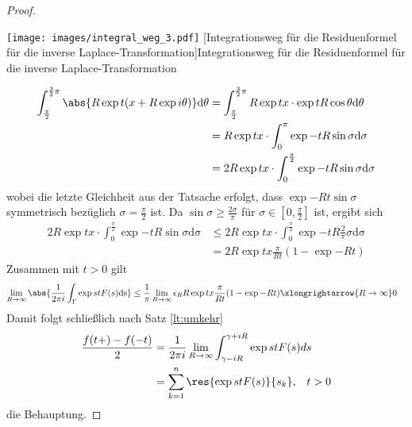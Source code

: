 \begin{satz}
\begin{proof}
\begin{minipage}{0.36\textwidth}
\begin{flushright}
		\texttt{[image: images/integral\_weg\_3.pdf]}
		[Integrationsweg für die Residuenformel für die inverse Laplace-Transformation]{Integrationsweg für die Residuenformel für die inverse Laplace-Transformation}
\end{flushright}
\end{minipage}
\begin{align}
	\int_{\frac{\pi}{2}}^{\frac{3}{2}\pi} \abs{R \exp{t (x+R  \exp{i \theta })} } \mathrm{d\theta} 
	&= \int_{\frac{\pi}{2}}^{\frac{3}{2}\pi} R \exp{tx} \cdot \exp{t R \cos{\theta}} \mathrm{d\theta} \\
	&= R \exp{tx} \cdot \int_{0}^{{\pi}} \exp{-t R \sin{\sigma}}	\mathrm{d\sigma}\\
	&= 2 R \exp{tx} \cdot \int_{0}^{\frac{\pi}{2}} \exp{-t R \sin{\sigma}}	\mathrm{d\sigma}\\
\end{align} 
wobei die letzte Gleichheit aus der Tatsache erfolgt, dass $\exp{-R t \sin{\sigma}}$ symmetrisch bezüglich $\sigma = \frac{\pi}{2}$ ist. Da $\sin{\sigma} \geq \frac{2 \sigma}{\pi}$ für $\sigma \in [0, \frac{\pi}{2}]$ ist, ergibt sich
\begin{align}
	2 R \exp{tx} \cdot \int_{0}^{\frac{\pi}{2}} \exp{-t R \sin{\sigma}}\mathrm{d\sigma} &\leq 2 R \exp{tx} \cdot \int_{0}^{\frac{\pi}{2}} \exp{-t R \frac{2}{\pi} \sigma}\mathrm{d\sigma}\\
	&= 2 R \exp{tx} \frac{\pi}{R t} (1 - \exp{-Rt})
\end{align}
Zusammen mit $t> 0$ gilt
\begin{align}
	 \lim_{R \rightarrow \infty}{\abs{\frac{1}{2\pi i} \int_{\Gamma} \exp{st}F(s)\mathrm{ds}}} 
	 &\leq 	\frac{1}{\pi} \lim_{R \rightarrow \infty} \epsilon_R R \exp{tx} \frac{\pi}{R t} (1 - \exp{-Rt})
	 \xlongrightarrow{R \rightarrow \infty} 0
\end{align}
Damit folgt schließlich nach Satz \ref{lt:umkehr} 
\begin{align}
\frac{f(t+) - f(-t)}{2} &= \frac{1}{2 \pi i } \lim_{R \rightarrow \infty} \int_{\gamma - i R}^{\gamma+ i R} \exp{st} F(s) ds \\
	&= \sum_{k=1}^{n} \res{\exp{st} F(s)}{s_k} \text{,} \quad t > 0
\end{align}
die Behauptung.
\end{proof}
\end{satz}\cite{Lauf2006}
